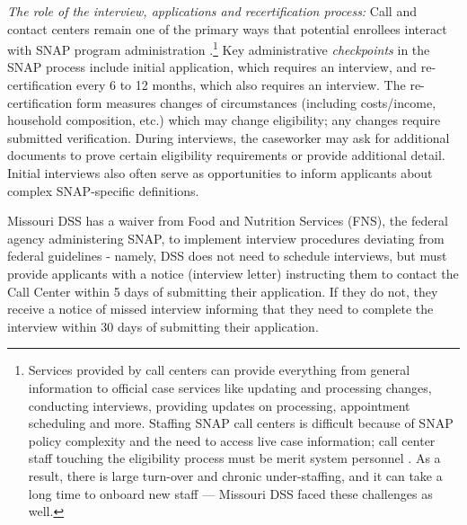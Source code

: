 \documentclass[manuscript,screen,authorversion]{acmart}
\begin{document}
\textit{The role of the interview, applications and recertification process: } Call and contact centers remain one of the primary ways that potential enrollees interact with SNAP program administration \citep{fns}.\footnote{Services provided by call centers can provide everything from general information to official case services like updating and processing changes, conducting interviews, providing updates on processing, appointment scheduling and more. Staffing SNAP call centers is difficult because of SNAP policy complexity and the need to access live case information; call center staff touching the eligibility process must be merit system personnel \citep{fns}. As a result, there is large turn-over and chronic under-staffing, and it can take a long time to onboard new staff  \citep{Coffey_2017} --- Missouri DSS faced these challenges as well.} 
Key administrative \textit{checkpoints} \citep{kim2025administrative} in the SNAP process include initial application, which requires an interview, and re-certification every 6 to 12 months, which also requires an interview. The re-certification form measures changes of circumstances (including costs/income, household composition, etc.) %
which may change eligibility; any changes require submitted verification. During interviews, the caseworker may ask for additional documents to prove certain eligibility requirements or provide additional detail. Initial interviews also often serve as opportunities to inform applicants about complex SNAP-specific definitions. %


Missouri DSS has a waiver from Food and Nutrition Services (FNS), the federal agency administering SNAP, to implement interview procedures deviating from federal guidelines - namely, DSS does not need to schedule interviews, but must provide applicants with a notice (interview letter) instructing them to contact the Call Center within 5 days of submitting their application. If they do not, they receive a notice of missed interview informing that they need to complete the interview within 30 days of submitting their application. 
\end{document}
